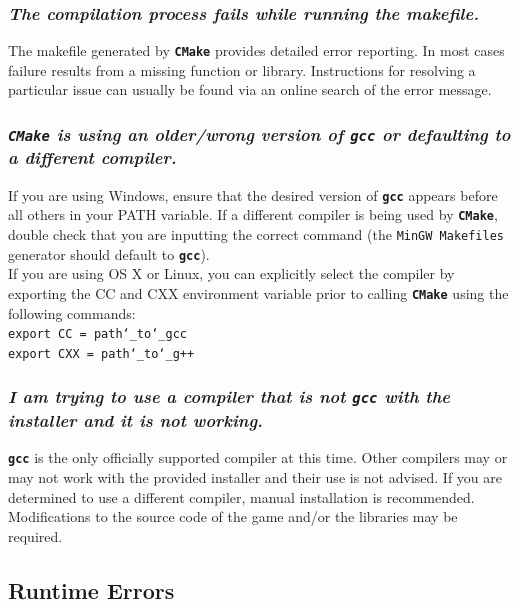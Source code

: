 \documentclass[12pt, titlepage]{article}
\begin{document}
\subsubsection{\emph{The compilation process fails while running the makefile.}}
\noindent The makefile generated by \texttt{\bf CMake} provides detailed error reporting.  In most cases failure results from a missing function or library.  Instructions for resolving a particular issue can usually be found via an online search of the error message.

\subsubsection{\emph{\texttt{CMake} is using an older/wrong version of \texttt{\bf gcc} or defaulting to a different compiler.}}
\noindent If you are using Windows, ensure that the desired version of \texttt{\bf gcc} appears before all others in your PATH variable.  If a different compiler is being used by \texttt{\bf CMake}, double check that you are inputting the correct command (the \texttt{MinGW Makefiles} generator should default to \texttt{\bf gcc}).\\

\noindent If you are using OS X or Linux, you can explicitly select the compiler by exporting the CC and CXX environment variable prior to calling \texttt{\bf CMake} using the following commands:\\

\noindent \qquad \texttt{export CC = path\char`_to\char`_gcc}\\
${}$\noindent \qquad \texttt{export CXX = path\char`_to\char`_g++}


\subsubsection{\emph{I am trying to use a compiler that is not \texttt{gcc} with the installer and it is not working.}}
\noindent \texttt{\bf gcc} is the only officially supported compiler at this time.  Other compilers may or may not work with the provided installer and their use is not advised.  If you are determined to use a different compiler, manual installation is recommended.  Modifications to the source code of the game and/or the libraries may be required.


\subsection{Runtime Errors}
\end{document}
